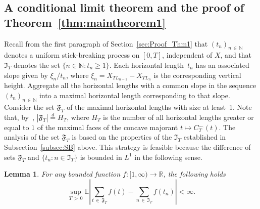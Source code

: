 \documentclass[10pt]{amsart}
\newtheorem{lemm}[theo]{Lemma}\newtheorem{prop}[theo]{Proposition}\newtheorem{coro}[theo]{Corollary}\newtheorem{conj}[theo]{Conjecture}
\theoremstyle{definition}\newtheorem{defi}[theo]{Definition}\newtheorem{rema}[theo]{Remark}\newtheorem{exam}[theo]{Example}\newtheorem{exem}[theo]{Example}\newtheorem{nota}[theo]{Notation}
\newcommand\N{\mathbb{N}}
\newcommand\R{\mathbb{R}}
\newcommand\E{\mathds{E}}
\newcommand\1{\mathds{1}}
\newcommand\GF{\mathfrak{F}}
\newcommand\GI{\mathfrak{I}}
\newcommand\eqd{\overset{d}{=}}
\begin{document}
\subsection{A conditional limit theorem and the proof of Theorem~\ref{thm:maintheorem1}}\label{subsec:proof_thm1}


Recall from the first paragraph of Section~\ref{sec:Proof_Thm1} that $(t_n)_{n\,\in\,\N}$ denotes a uniform stick-breaking process on $[0,T]$, independent of $X$, and that $\GI_T$ denotes the set $\{n\in\N:t_n\ge 1\}$. Each horizontal length~$t_n$ has an associated slope given by $\xi_n/t_n$, where $\xi_n=X_{TL_{n-1}}-X_{TL_n}$ is the corresponding vertical height. Aggregate all the horizontal lengths with a common slope in the sequence $(t_n)_{n\,\in\,\N}$ into a maximal horizontal length corresponding to that slope. Consider the set $\GF_T$ of the maximal horizontal lengths with size at least~1. Note that, by~\cite[Theorem~11]{CM_Fluctuation_Levy}, $|\GF_T|\eqd H_T$, where $H_T$ is the number of all horizontal lengths greater or equal to $1$ of the maximal faces of the concave majorant $t\mapsto C_T^\frown(t)$. The analysis of the set $\GF_T$ is based on the properties of the $\GI_T$ established in Subsection~\ref{subsec:SB} above. This strategy is feasible because the difference of sets $\GF_T$ and $\{t_n:n\in\GI_T\}$ is bounded in $L^1$ in the following sense.



\begin{lemm}\label{lem:face_discrepancy}
For any bounded function $f:[1,\infty)\to\R$, the following holds
\[
\sup_{T\,>\,0}\E\left|\sum_{t\,\in\,\GF_T}f(t) -\sum_{n\,\in\,\GI_T}f(t_n)\right|<\infty.
\]
\end{lemm}
\end{document}

